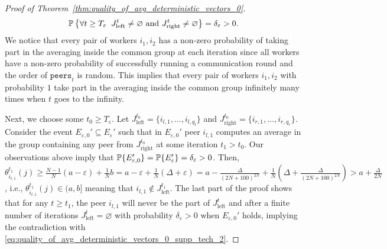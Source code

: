 \begin{proof}[Proof of Theorem~\ref{thm:quality_of_avg_deterministic_vectors_0}]
    \begin{equation}
        \mathbb{P}\left\{\forall t \ge T_{\varepsilon}\;\; J_{\text{left}}^t \neq \varnothing\text{ and }  J_{\text{right}}^t \neq \varnothing\right\} = \delta_{\varepsilon} > 0. \label{eq:quality_of_avg_deterministic_vectors_0_supp_tech_2}
    \end{equation}
    We notice that every pair of workers $i_1,i_2$ has a non-zero probability of taking part in the averaging inside the common group at each iteration since all workers have a non-zero probability of successfully running a communication round and the order of $\texttt{peers}_t$ is random. This implies that every pair of workers $i_1,i_2$ with probability $1$ take part in the averaging inside the common group infinitely many times when $t$ goes to the infinity.
    
    Next, we choose some $t_0 \ge T_{\varepsilon}$. Let $J_{\text{left}}^{t_0} = \{i_{l,1},\ldots, i_{l,q_l}\}$ and $J_{\text{right}}^{t_0} = \{i_{r,1},\ldots, i_{r,q_r}\}$. Consider the event $E_{\varepsilon,0}' \subseteq E_{\varepsilon}'$ such that in $E_{\varepsilon,0}'$ peer $i_{l,1}$ computes an average in the group containing any peer from $J_{\text{right}}^{t_0}$ at some iteration $t_1 > t_0$. Our observations above imply that $\mathbb{P}\{E_{\varepsilon,0}'\} = \mathbb{P}\{E_{\varepsilon}'\} = \delta_{\varepsilon} > 0$. Then, $\theta_{i_{l,1}}^{t_1}(j) \ge \frac{N-1}{N}(a-\varepsilon) + \frac{1}{N}b = a-\varepsilon + \frac{1}{N}(\Delta + \varepsilon) = a - \frac{\Delta}{(2N+100)^{2N}} + \frac{1}{N}\left(\Delta + \frac{\Delta}{(2N+100)^{2N}}\right) > a + \frac{\Delta}{2N}$, i.e., $\theta_{i_{l,1}}^{t_1}(j) \in (a,b]$ meaning that $i_{l,1} \not\in J_{\text{left}}^{t_1}$. The last part of the proof shows that for any $t\ge t_1$, the peer $i_{l,1}$ will never be the part of $J_{\text{left}}^t$ and after a finite number of iterations $J_{\text{left}}^t = \varnothing$ with probability $\delta_{\varepsilon} > 0$ when $E_{\varepsilon,0}'$ holds, implying the contradiction with \eqref{eq:quality_of_avg_deterministic_vectors_0_supp_tech_2}.
    

\end{proof}

